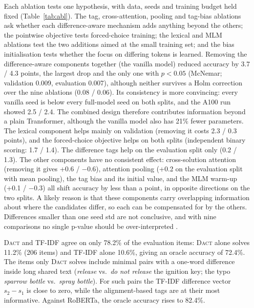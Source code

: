 \documentclass[11pt]{article}
\newcommand{\dact}{\textsc{Dact}}
\begin{document}
Each ablation tests one hypothesis, with data, seeds and training budget held fixed (Table~\ref{tab:abl}). The tag, cross-attention, pooling and tag-bias ablations ask whether each difference-aware mechanism adds anything beyond the others; the pointwise objective tests forced-choice training; the lexical and MLM ablations test the two additions aimed at the small training set; and the bias initialisation tests whether the focus on differing tokens is learned. Removing the difference-aware components together (the vanilla model) reduced accuracy by 3.7 / 4.3 points, the largest drop and the only one with $p{<}0.05$ (McNemar; validation 0.009, evaluation 0.007), although neither survives a Holm correction over the nine ablations (0.08 / 0.06). Its consistency is more convincing: every vanilla seed is below every full-model seed on both splits, and the A100 run showed 2.5 / 2.4. The combined design therefore contributes information beyond a plain Transformer, although the vanilla model also has 21\% fewer parameters. The lexical component helps mainly on validation (removing it costs 2.3 / 0.3 points), and the forced-choice objective helps on both splits (independent binary scoring: 1.7 / 1.4). The difference tags help on the evaluation split only (0.2 / 1.3). The other components have no consistent effect: cross-solution attention (removing it gives +0.6 / $-$0.6), attention pooling (+0.2 on the evaluation split with mean pooling), the tag bias and its initial value, and the MLM warm-up (+0.1 / $-$0.3) all shift accuracy by less than a point, in opposite directions on the two splits. A likely reason is that these components carry overlapping information about where the candidates differ, so each can be compensated for by the others. Differences smaller than one seed std are not conclusive, and with nine comparisons no single p-value should be over-interpreted \cite{dror2018hitchhiker}.

\dact{} and TF-IDF agree on only 78.2\% of the evaluation items: \dact{} alone solves 11.2\% (206 items) and TF-IDF alone 10.6\%, giving an oracle accuracy of 72.4\%. The items only \dact{} solves include minimal pairs with a one-word difference inside long shared text (\emph{release} vs.\ \emph{do not release} the ignition key; the typo \emph{sparrow bottle} vs.\ \emph{spray bottle}). For such pairs the TF-IDF difference vector $s_2 - s_1$ is close to zero, while the alignment-based tags are at their most informative. Against RoBERTa, the oracle accuracy rises to 82.4\%.
\end{document}
